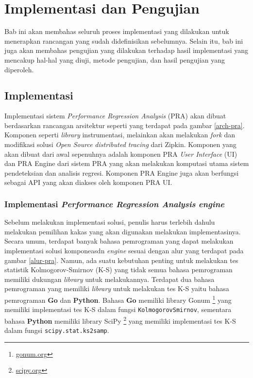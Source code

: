 \chapter{Implementasi dan Pengujian}

Bab ini akan membahas seluruh proses implementasi yang dilakukan untuk menerapkan rancangan yang sudah didefinisikan sebelumnya. Selain itu, bab ini juga akan membahas pengujian yang dilakukan terhadap hasil implementasi yang mencakup hal-hal yang diuji, metode pengujian, dan hasil pengujian yang diperoleh. 


\section{Implementasi}
Implementasi sistem \textit{Performance Regression Analysis} (PRA) akan dibuat berdasarkan rancangan arsitektur seperti yang terdapat pada gambar \ref{arch-pra}. Komponen seperti \textit{library} instrumentasi, melainkan akan melakukan \textit{fork} dan modifikasi solusi \textit{Open Source} \textit{distributed tracing} dari Zipkin. Komponen yang akan dibuat dari awal sepenuhnya adalah komponen PRA \textit{User Interface} (UI) dan PRA Engine dari sistem PRA yang akan melakukan komputasi utama sistem pendeteksian dan analisis regresi. Komponen PRA Engine juga akan berfungsi sebagai API yang akan diakses oleh komponen PRA UI.



\subsection{Implementasi \textit{Performance Regression Analysis} \textit{engine}}

Sebelum melakukan implementasi solusi, penulis harus terlebih dahulu melakukan pemilihan kakas yang akan digunakan melakukan implementasinya. Secara umum, terdapat banyak bahasa pemrograman yang dapat melakukan implementasi solusi komponeasdn \textit{engine} sesuai dengan alur yang terdapat pada gambar \ref{alur-pra}. Namun, ada suatu kebutuhan penting untuk melakukan tes statistik Kolmogorov-Smirnov (K-S) yang tidak semua bahasa pemrograman memiliki dukungan \textit{library} untuk melakukannya. Terdapat dua bahasa pemrograman yang memiliki \textit{library} untuk melakukan tes K-S yaitu bahasa pemrograman \textbf{Go} dan \textbf{Python}. Bahasa \textbf{Go} memiliki library Gonum \footnote{\url{gonum.org}} yang memiliki implementasi tes K-S dalam fungsi \texttt{KolmogorovSmirnov}, sementara bahasa \textbf{Python} memiliki library SciPy \footnote{\url{scipy.org}} yang memiliki implementasi tes K-S dalam fungsi \texttt{scipy.stat.ks\textunderscore 2samp}.

